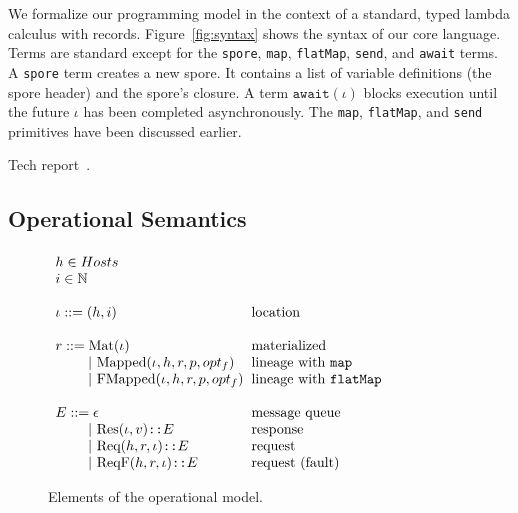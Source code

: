 \documentclass[10pt]{sigplanconf}
\theoremstyle{definition}
\theoremstyle{definition}
\newcommand{\gap}{\quad\quad}
\newcommand{\ba}{\begin{array}}
\newcommand{\ea}{\end{array}}
\begin{document}
We formalize our programming model in the context of a standard, typed lambda
calculus with records. Figure~\ref{fig:syntax} shows the syntax of our core
language. Terms are standard except for the \texttt{spore}, \texttt{map},
\texttt{flatMap}, \texttt{send}, and \texttt{await} terms. A \texttt{spore}
term creates a new spore. It contains a list of variable definitions (the spore
header) and the spore's closure. A term $\texttt{await}(\iota)$ blocks
execution until the future $\iota$ has been completed asynchronously. The
\texttt{map}, \texttt{flatMap}, and \texttt{send} primitives have been
discussed earlier.

Tech report~\cite{FPTechReport}.

\subsection{Operational Semantics}
\label{sec:opsem}

\begin{figure}[ht!]
  \centering

  $\ba[t]{l@{\hspace{2mm}}l}
h \in Hosts &
\\
i \in \mathbb{N} &
\\
 & \\
\iota  ::=  (h, i)                               & \mbox{location}
\\
 & \\
r ::=     \text{Mat}(\iota) & \mbox{materialized}
\\
\gap ~|~  \text{Mapped}(\iota, h, r, p, opt_f)   & \mbox{lineage with \texttt{map}}
\\
\gap ~|~  \text{FMapped}(\iota, h, r, p, opt_f)  & \mbox{lineage with \texttt{flatMap}}
\\
 & \\
E      ::=  \epsilon & \mbox{message queue}
\\
\gap ~|~    \text{Res}(\iota, v) \texttt{::} E      & \mbox{response}
\\
\gap ~|~    \text{Req}(h, r, \iota) \texttt{::} E   & \mbox{request}
\\
\gap ~|~    \text{ReqF}(h, r, \iota) \texttt{::} E  & \mbox{request (fault)}
\\
  \ea$

  \vspace{1mm}
  \caption{Elements of the operational model.}
  \label{fig:elems-opsem}
  \vspace{1mm}
\end{figure}
\end{document}
